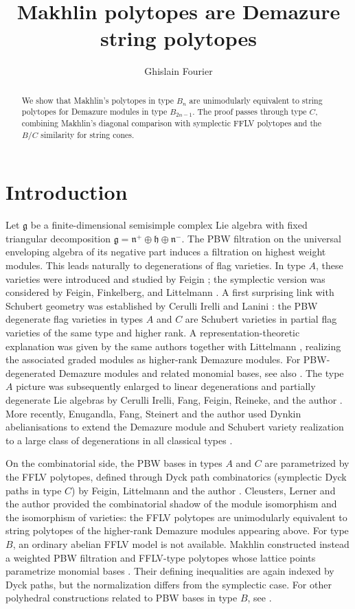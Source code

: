 \documentclass[a4paper, 12pt]{amsart}
\title[Makhlin polytopes and Demazure string polytopes]{Makhlin polytopes are Demazure string polytopes}
\author{Ghislain Fourier}
\begin{document}
\begin{abstract}
We show that Makhlin's polytopes in type $B_n$ are unimodularly equivalent to string polytopes for Demazure modules in type $B_{2n-1}$. The proof passes through type $C$, combining Makhlin's diagonal comparison with symplectic FFLV polytopes and the $B/C$ similarity for string cones.
\end{abstract}

\maketitle

\section{Introduction}

Let $\mathfrak{g}$ be a finite-dimensional semisimple complex Lie algebra with fixed triangular decomposition $\mathfrak{g} = \mathfrak{n}^+ \oplus \mathfrak{h} \oplus \mathfrak{n}^-$. The PBW filtration on the universal enveloping algebra of its negative part induces a filtration on highest weight modules. This leads naturally to degenerations of flag varieties. In type $A$, these varieties were introduced and studied by Feigin \cite{Fei11,Fei12}; the symplectic version was considered by Feigin, Finkelberg, and Littelmann \cite{FFL14}. 
A first surprising link with Schubert geometry was established by Cerulli Irelli and Lanini \cite{CL15}: the PBW degenerate flag varieties in types $A$ and $C$ are Schubert varieties in partial flag varieties of the same type and higher rank. A representation-theoretic explanation was given by the same authors together with Littelmann \cite{CILL16}, realizing the associated graded modules as higher-rank Demazure modules. 
For PBW-degenerated Demazure modules and related monomial bases, see also \cite{Fou16,BFK23}. 
The type $A$ picture was subsequently enlarged to linear degenerations and partially degenerate Lie algebras by Cerulli Irelli, Fang, Feigin, Reineke, and the author \cite{CIFFR17}. 
More recently, Enugandla, Fang, Steinert and the author used Dynkin abelianisations to extend the Demazure module and Schubert variety realization to a large class of degenerations in all classical types \cite{EFFS24}.

On the combinatorial side, the PBW bases in types $A$ and $C$ are parametrized by the FFLV polytopes, defined through Dyck path combinatorics (symplectic Dyck paths in type $C$) by Feigin, Littelmann and the author \cite{FFL11A,FFL11C}. Cleusters, Lerner and the author \cite{CFL24} provided the combinatorial shadow of the module isomorphism and the isomorphism of varieties: the FFLV polytopes are unimodularly equivalent to string polytopes of the higher-rank Demazure modules appearing above. For type $B$, an ordinary abelian FFLV model is not available. Makhlin constructed instead a weighted PBW filtration and FFLV-type polytopes whose lattice points parametrize monomial bases \cite{Mak19}. Their defining inequalities are again indexed by Dyck paths, but the normalization differs from the symplectic case. For other polyhedral constructions related to PBW bases in type $B$, see \cite{BK19,MM25}.
\end{document}
